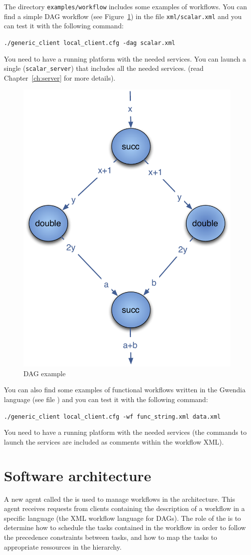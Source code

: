 The directory \texttt{examples/workflow} includes some examples of
workflows.  You can find a simple DAG workflow (see
Figure~\ref{fig:example1}) in the file \texttt{xml/scalar.xml} and you
can test it with the following command:

\verb|./generic_client local_client.cfg -dag scalar.xml |

You need to have a running \diet platform with the needed services. You
can launch a single \sed (\texttt{scalar\_server}) that includes all the
needed services. (read Chapter~\ref{ch:server} for more details).

\begin{figure}[htbp]
  \centering
  \includegraphics[keepaspectratio,width=0.4\linewidth]{fig/wf_example1}
  \caption{DAG example}
  \label{fig:example1}
\end{figure}

You can also find some examples of functional workflows written in the
Gwendia language (see file ) and you can
test it with the following command:

\verb|./generic_client local_client.cfg -wf func_string.xml data.xml |

You need to have a running \diet platform with the needed services (the
commands to launch the services are included as comments within the
workflow XML).

\section{Software architecture}

A new agent called the \textit{\madag} is used to manage workflows
in the \diet architecture. This agent receives requests from clients
containing the description of a workflow in a specific language
(the \madag XML workflow language for DAGs). The role of the \madag is to
determine how to schedule the tasks contained in the workflow in
order to follow the precedence constraints between tasks, and how to
map the tasks to appropriate ressources in the \diet hierarchy.


